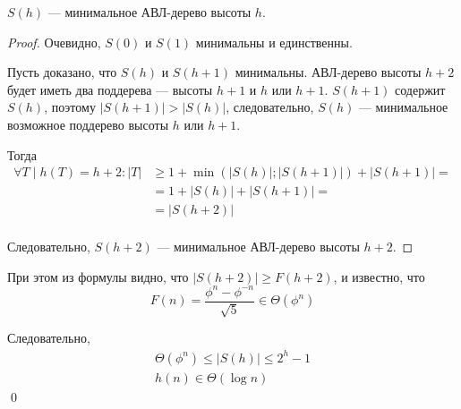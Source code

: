 \begin{statement}
    $S(h)$ --- минимальное АВЛ-дерево высоты $h$.
\end{statement}
\begin{proof}
    Очевидно, $S(0)$ и $S(1)$ минимальны и единственны.

    Пусть доказано, что $S(h)$ и $S(h + 1)$ минимальны.
    АВЛ-дерево высоты $h + 2$ будет иметь два поддерева
    --- высоты $h + 1$ и $h$ или $h + 1$.
    $S(h + 1)$ содержит $S(h)$, поэтому
    $|S(h + 1)| > |S(h)|$, следовательно,
    $S(h)$ --- минимальное возможное поддерево высоты
    $h$ или $h + 1$.

    Тогда
    \begin{align*}
        \forall T \mid h(T) = h + 2 :
        |T| & \ge 1 + \min(|S(h)|; |S(h + 1)|) + |S(h + 1)| = \\
        & = 1 + |S(h)| + |S(h + 1)| = \\
        & = |S(h + 2)| \\
    \end{align*}

    Следовательно, $S(h + 2)$ --- минимальное
    АВЛ-дерево высоты $h + 2$.
\end{proof}

При этом из формулы видно, что
$|S(h + 2)| \ge F(h + 2)$,
и известно, что
\[
    F(n) = \frac{\phi^n - \phi^{-n}}{\sqrt{5}} \in \Theta(\phi^n)
\]

Следовательно,
\begin{gather*}
    \Theta(\phi^n) \le |S(h)| \le 2^h - 1 \\
    h(n) \in \Theta(\log n)
\end{gather*}
\qed
